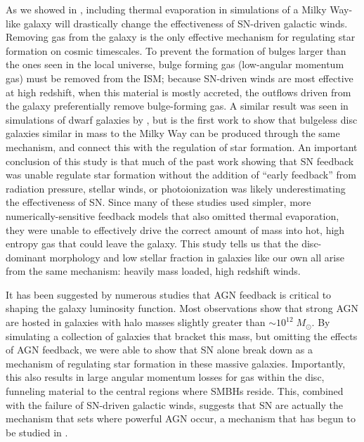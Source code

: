 As we showed in \citet{Keller2015}, including thermal evaporation in simulations
of a Milky Way-like galaxy will drastically change the effectiveness of
SN-driven galactic winds.  Removing gas from the galaxy is the only effective
mechanism for regulating star formation on cosmic timescales.  To prevent the
formation of bulges larger than the ones seen in the local universe, bulge
forming gas (low-angular momentum gas) must be removed from the ISM; because
SN-driven winds are most effective at high redshift, when this material is
mostly accreted, the outflows driven from the galaxy preferentially remove
bulge-forming gas.  A similar result was seen in simulations of dwarf galaxies
by \citet{Governato2010, Brook2011}, but \citet{Keller2015} is the first work to
show that bulgeless disc galaxies similar in mass to the Milky Way can be
produced through the same mechanism, and connect this with the regulation of
star formation.  An important conclusion of this study is that much of the past
work \citet{Stinson2013,Agertz2013,Hopkins2014} showing that SN feedback was
unable regulate star formation without the addition of ``early feedback'' from
radiation pressure, stellar winds, or photoionization was likely underestimating
the effectiveness of SN.  Since many of these studies used simpler, more
numerically-sensitive feedback models that also omitted thermal evaporation,
they were unable to effectively drive the correct amount of mass into hot, high
entropy gas that could leave the galaxy.  This study tells us that the
disc-dominant morphology and low stellar fraction in galaxies like our own all
arise from the same mechanism:  heavily mass loaded, high redshift winds.

It has been suggested by numerous studies \citep{Benson2003,Bower2006} that AGN
feedback is critical to shaping the galaxy luminosity function.  Most
observations \citep{Kauffmann2003b} show that strong AGN are hosted in galaxies
with halo masses slightly greater than $\sim10^{12}\;M_\odot$.  By simulating a
collection of galaxies that bracket this mass, but omitting the effects of AGN
feedback, we were able to show that SN alone break down as a mechanism of
regulating star formation in these massive galaxies.  Importantly, this also
results in large angular momentum losses for gas within the disc, funneling
material to the central regions where SMBHs reside.  This, combined with the
failure of SN-driven galactic winds, suggests that SN are actually the mechanism
that sets where powerful AGN occur, a mechanism that has begun to be studied in
\citet{Bower2016}.

